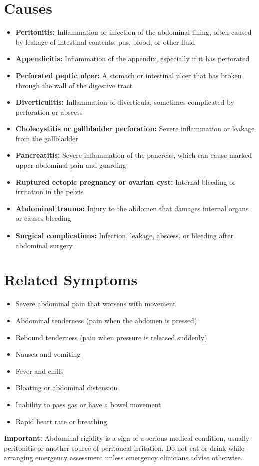 \section*{Causes}
\begin{itemize}
  \item \textbf{Peritonitis:} Inflammation or infection of the abdominal lining, often caused by leakage of intestinal contents, pus, blood, or other fluid
  \item \textbf{Appendicitis:} Inflammation of the appendix, especially if it has perforated
  \item \textbf{Perforated peptic ulcer:} A stomach or intestinal ulcer that has broken through the wall of the digestive tract
  \item \textbf{Diverticulitis:} Inflammation of diverticula, sometimes complicated by perforation or abscess
  \item \textbf{Cholecystitis or gallbladder perforation:} Severe inflammation or leakage from the gallbladder
  \item \textbf{Pancreatitis:} Severe inflammation of the pancreas, which can cause marked upper-abdominal pain and guarding
  \item \textbf{Ruptured ectopic pregnancy or ovarian cyst:} Internal bleeding or irritation in the pelvis
  \item \textbf{Abdominal trauma:} Injury to the abdomen that damages internal organs or causes bleeding
  \item \textbf{Surgical complications:} Infection, leakage, abscess, or bleeding after abdominal surgery
\end{itemize}

\section*{Related Symptoms}
\begin{itemize}
  \item Severe abdominal pain that worsens with movement
  \item Abdominal tenderness (pain when the abdomen is pressed)
  \item Rebound tenderness (pain when pressure is released suddenly)
  \item Nausea and vomiting
  \item Fever and chills
  \item Bloating or abdominal distension
  \item Inability to pass gas or have a bowel movement
  \item Rapid heart rate or breathing
\end{itemize}
\textbf{Important:} Abdominal rigidity is a sign of a serious medical condition, usually peritonitis or another source of peritoneal irritation. Do not eat or drink while arranging emergency assessment unless emergency clinicians advise otherwise.

